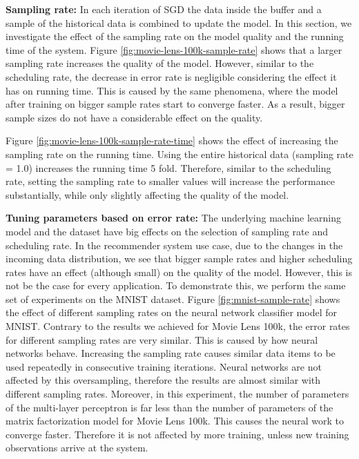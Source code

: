 \documentclass{vldb}
\begin{document}
\textbf{Sampling rate:} In each iteration of SGD the data inside the buffer and a sample of the historical data is combined to update the model.
In this section, we investigate the effect of the sampling rate on the model quality and the running time of the system.
Figure \ref{fig:movie-lens-100k-sample-rate} shows that a larger sampling rate increases the quality of the model.
However, similar to the scheduling rate, the decrease in error rate is negligible considering the effect it has on running time. 
This is caused by the same phenomena, where the model after training on bigger sample rates start to converge faster.
As a result, bigger sample sizes do not have a considerable effect on the quality.
 
Figure \ref{fig:movie-lens-100k-sample-rate-time} shows the effect of increasing the sampling rate on the running time.
Using the entire historical data (sampling rate = 1.0) increases the running time 5 fold. 
Therefore, similar to the scheduling rate, setting the sampling rate to smaller values will increase the performance substantially, while only slightly affecting the quality of the model.

\textbf{Tuning parameters based on error rate:} The underlying machine learning model and the dataset have big effects on the selection of sampling rate and scheduling rate.
In the recommender system use case, due to the changes in the incoming data distribution, we see that bigger sample rates and higher scheduling rates have an effect (although small) on the quality of the model.
However, this is not be the case for every application.
To demonstrate this, we perform the same set of experiments on the MNIST dataset.
Figure \ref{fig:mnist-sample-rate} shows the effect of different sampling rates on the neural network classifier model for MNIST.
Contrary to the results we achieved for Movie Lens 100k, the error rates for different sampling rates are very similar.
This is caused by how neural networks behave.
Increasing the sampling rate causes similar data items to be used repeatedly in consecutive training iterations.
Neural networks are not affected by this oversampling, therefore the results are almost similar with different sampling rates.
Moreover, in this experiment, the number of parameters of the multi-layer perceptron is far less than the number of parameters of the matrix factorization model for Movie Lens 100k.
This causes the neural work to converge faster.
Therefore it is not affected by more training, unless new training observations arrive at the system.
\end{document}
